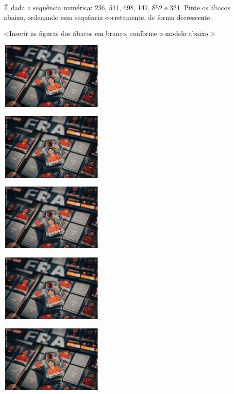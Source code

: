 É dada a sequência numérica: 236, 541, 698, 147, 852 e 321. Pinte os
ábacos abaixo, ordenando essa sequência corretamente, de forma
decrescente.

\textless{}Inserir as figuras dos ábacos em branco, conforme o modelo
abaixo.\textgreater{}

\includegraphics[width=2.03125in,height=1.32438in]{media/image17.png}

\includegraphics[width=2.03125in,height=1.32438in]{media/image17.png}

\includegraphics[width=2.03125in,height=1.32438in]{media/image17.png}

\includegraphics[width=2.03125in,height=1.32438in]{media/image17.png}

\includegraphics[width=2.03125in,height=1.32438in]{media/image17.png}

